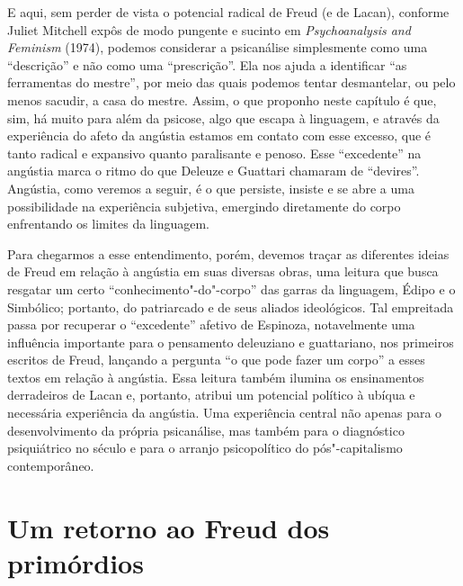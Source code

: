 E aqui, sem perder de vista o potencial radical de Freud (e de Lacan),
conforme Juliet Mitchell expôs de modo pungente e sucinto em
\emph{Psychoanalysis and Feminism} (1974), podemos considerar a
psicanálise simplesmente como uma ``descrição'' e não como uma
``prescrição''. Ela nos ajuda a identificar ``as ferramentas do
mestre'', por meio das quais podemos tentar desmantelar, ou pelo menos
sacudir, a casa do mestre. Assim, o que proponho neste capítulo é que,
sim, há muito para além da psicose, algo que escapa à linguagem, e
através da experiência do afeto da angústia estamos em contato com esse
excesso, que é tanto radical e expansivo quanto paralisante e penoso.
Esse ``excedente'' na angústia marca o ritmo do que Deleuze e Guattari
chamaram de ``devires''. Angústia, como veremos a seguir, é o que
persiste, insiste e se abre a uma possibilidade na experiência
subjetiva, emergindo diretamente do corpo enfrentando os limites da
linguagem.

Para chegarmos a esse entendimento, porém, devemos traçar as diferentes
ideias de Freud em relação à angústia em suas diversas obras, uma
leitura que busca resgatar um certo ``conhecimento"-do"-corpo'' das garras
da linguagem, Édipo e o Simbólico; portanto, do patriarcado e de seus
aliados ideológicos. Tal empreitada passa por recuperar o ``excedente''
afetivo de Espinoza, notavelmente uma influência importante para o
pensamento deleuziano e guattariano, nos primeiros escritos de Freud,
lançando a pergunta ``o que pode fazer um corpo'' a esses textos em
relação à angústia. Essa leitura também ilumina os ensinamentos
derradeiros de Lacan e, portanto, atribui um potencial político à ubíqua
e necessária experiência da angústia. Uma experiência central não apenas
para o desenvolvimento da própria psicanálise, mas também para o
diagnóstico psiquiátrico no século  e para o arranjo psicopolítico do
pós"-capitalismo contemporâneo.

\section{Um retorno ao Freud dos primórdios}

